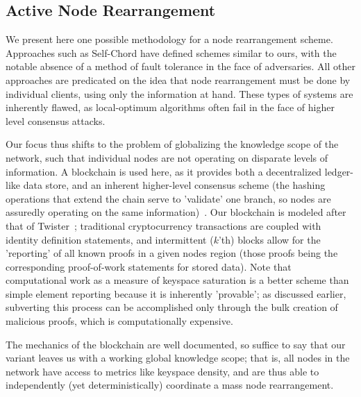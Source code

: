 \documentclass[10pt]{IEEEtran}
\begin{document}
\subsection{Active Node Rearrangement}

\par We present here one possible methodology for a node rearrangement scheme. Approaches such as Self-Chord have defined schemes similar to ours, with the notable absence of a method of fault tolerance in the face of adversaries. All other approaches are predicated on the idea that node rearrangement must be done by individual clients, using only the information at hand. These types of systems are inherently flawed, as local-optimum algorithms often fail in the face of higher level consensus attacks.

\par Our focus thus shifts to the problem of globalizing the knowledge scope of the network, such that individual nodes are not operating on disparate levels of information. A blockchain is used here, as it provides both a decentralized ledger-like data store, and an inherent higher-level consensus scheme (the hashing operations that extend the chain serve to 'validate' one branch, so nodes are assuredly operating on the same information)~\cite{Nakamoto:2008ti}. Our blockchain is modeled after that of Twister~\cite{Freitas:2013tb}; traditional cryptocurrency transactions are coupled with identity definition statements, and intermittent ($k$'th) blocks allow for the 'reporting' of all known proofs in a given nodes region (those proofs being the corresponding proof-of-work statements for stored data). Note that computational work as a measure of keyspace saturation is a better scheme than simple element reporting because it is inherently 'provable'; as discussed earlier, subverting this process can be accomplished only through the bulk creation of malicious proofs, which is computationally expensive.

\par The mechanics of the blockchain are well documented, so suffice to say that our variant leaves us with a working global knowledge scope; that is, all nodes in the network have access to metrics like keyspace density, and are thus able to independently (yet deterministically) coordinate a mass node rearrangement. 
\end{document}
